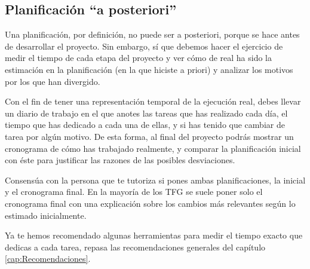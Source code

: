 \subsection{Planificación ``a posteriori''}

Una planificación, por definición, no puede ser a posteriori, porque se hace antes de desarrollar el proyecto. Sin embargo, sí que debemos hacer el ejercicio de medir el tiempo de cada etapa del proyecto y ver cómo de real ha sido la estimación en la planificación (en la que hiciste a priori) y analizar los motivos por los que han divergido.

Con el fin de tener una representación temporal de la ejecución real, debes llevar un diario de trabajo en el que anotes las tareas que has realizado cada día, el tiempo que has dedicado a cada una de ellas, y si has tenido que cambiar de tarea por algún motivo. De esta forma, al final del proyecto podrás mostrar un cronograma de cómo has trabajado realmente, y comparar la planificación inicial con éste para justificar las razones de las posibles desviaciones.

Consensúa con la persona que te tutoriza si pones ambas planificaciones, la inicial y el cronograma final. En la mayoría de los TFG se suele poner solo el cronograma final con una explicación sobre los cambios más relevantes según lo estimado inicialmente. 



Ya te hemos recomendado algunas herramientas para medir el tiempo exacto que dedicas a cada tarea, repasa las recomendaciones generales del capítulo \ref{cap:Recomendaciones}.



